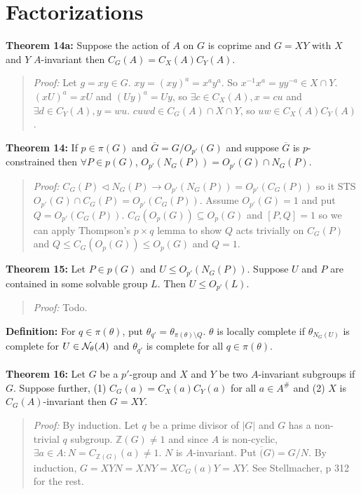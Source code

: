 \section {Factorizations}
{\bf Theorem 14a:}
Suppose the action of $A$ on $G$ is coprime and $G=XY$ with $X$ and $Y$ $A$-invariant then
$C_G(A)= C_X(A) C_Y(A)$.
\begin{quote}
\emph{Proof:} 
Let $g=xy \in G$.  $xy = (xy)^a=x^a y^a$.  So $x^{-1}x^a = yy^{-a} \in X \cap Y$.
$(xU)^a=xU$ and $(Uy)^a=Uy$, so 
$\exists c \in C_X(A), x=cu$ and
$\exists d \in C_Y(A), y=wu$.  $cuwd \in C_G(A) \cap X \cap Y$, so $uw \in C_X(A) C_Y(A)$.
\end{quote}
{\bf Theorem 14:}
If $p \in \pi(G)$ and ${\overline G}= G/ O_{p'}(G)$ and suppose ${\overline G}$ is $p$-constrained
then $\forall P \in p(G)$, $O_{p'}(N_G(P)) = O_{p'}(G) \cap N_G(P)$.
\begin{quote}
\emph{Proof:} 
$C_G(P) \lhd N_G(P) \rightarrow O_{p'}(N_G(P))= O_{p'}(C_G(P))$ so it STS
$O_{p'}(G) \cap C_G(P) = O_{p'}(C_G(P))$.  Assume $O_{p'}(G)=1$ and put $Q=O_{p'}(C_G(P))$.
$C_G(O_p(G)) \subseteq O_p(G)$ and $[P,Q]=1$ so we can apply Thompson's $p \times q$ lemma
to show $Q$ acts trivially on $C_G(P)$ and $Q \leq C_G(O_p(G)) \leq O_p(G)$ and $Q=1$.
\end{quote}
{\bf Theorem 15:}
Let $P \in p(G)$ and $U \leq O_{p'}(N_G(P))$.  Suppose $U$ and $P$ are contained in some solvable group
$L$.  Then $U \leq O_{p'}(L)$.
\begin{quote}
\emph{Proof:} Todo.
\end{quote}
{\bf Definition:} For $q \in \pi(\theta)$, put $\theta_{q'} = \theta_{\pi(\theta) \setminus Q}$.
$\theta$ is locally complete if $\theta_{N_G(U)}$ is complete for $U \in {\cal N}_{\theta}(A)$ and
$\theta_{q'}$ is complete for all $q \in \pi(\theta)$.
\\
\\
{\bf Theorem 16:}
Let $G$ be a $p'$-group and $X$ and $Y$ be two $A$-invariant subgroups if $G$.  Suppose further,
(1) $C_G(a)= C_X(a)C_Y(a)$ for all $a \in A^{\#}$ and (2) $X$ is $C_G(A)$-invariant then $G=XY$.
\begin{quote}
\emph{Proof:}
By induction.  Let $q$ be a prime divisor of $|G|$ and $G$ has a non-trivial $q$ subgroup.
$\mathbb{Z}(G) \ne 1$ and since $A$ is non-cyclic, $\exists a \in A: N=C_{\mathbb{Z}(G)}(a) \ne 1$.
$N$ is $A$-invariant.  Put $\overline(G) = G/N$.  By induction,
$G=XYN=XNY=X C_G(a)Y=XY$.
See Stellmacher, p 312 for the rest.
\end{quote}
